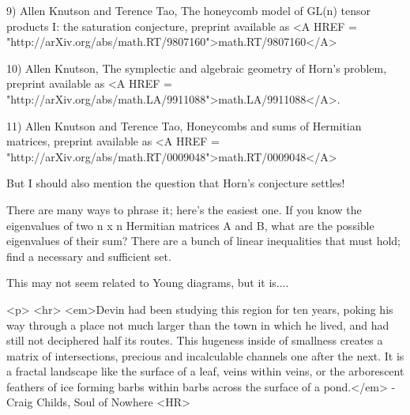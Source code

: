 9) Allen Knutson and Terence Tao, The honeycomb model of GL(n) tensor
products I: the saturation conjecture, preprint available as 
<A HREF = "http://arXiv.org/abs/math.RT/9807160">math.RT/9807160</A>

10) Allen Knutson, The symplectic and algebraic geometry of Horn's problem,
preprint available as
<A HREF = "http://arXiv.org/abs/math.LA/9911088">math.LA/9911088</A>.

11) Allen Knutson and Terence Tao, Honeycombs and sums of Hermitian
matrices, preprint available as <A HREF =
"http://arXiv.org/abs/math.RT/0009048">math.RT/0009048</A>

But I should also mention the question that Horn's conjecture settles!

There are many ways to phrase it; here's the easiest one.  If you
know the eigenvalues of two n x n Hermitian matrices A and B, what are
the possible eigenvalues of their sum?  There are a bunch of linear 
inequalities that must hold; find a necessary and sufficient set.

This may not seem related to Young diagrams, but it is....





<p> <hr>
<em>Devin had been studying this region for ten years, poking his
way through a place not much larger than the town in which he
lived, and had still not deciphered half its routes.  This hugeness
inside of smallness creates a matrix of intersections, precious
and incalculable channels one after the next.  It is a fractal landscape
like the surface of a leaf, veins within veins, or the arborescent
feathers of ice forming barbs within barbs across the surface of a pond.</em> -
Craig Childs, Soul of Nowhere
<HR>



